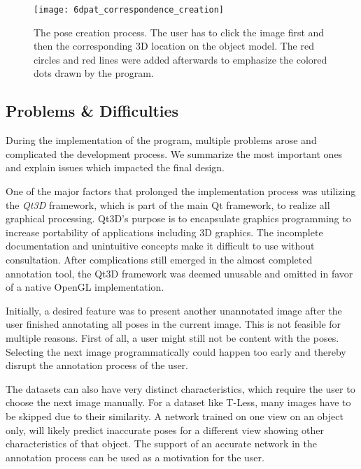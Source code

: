 \begin{figure}[!tbp]
	\centering
    \texttt{[image: 6dpat\_correspondence\_creation]}
    \caption{The pose creation process. The user has to click the image first and then the corresponding 3D location on the object model. The red circles and red lines were added afterwards to emphasize the colored dots drawn by the program.}
    \label{fig:6dpat_correspondence_creation}
\end{figure} 

\subsection{Problems \& Difficulties} \label{section:6dpat_difficulties}


During the implementation of the program, multiple problems arose and complicated the development process. We summarize the most important ones and explain issues which impacted the final design.

One of the major factors that prolonged the implementation process was utilizing the \textit{Qt3D} framework, which is part of the main Qt framework, to realize all graphical processing. Qt3D's purpose is to encapsulate graphics programming to increase portability of applications including 3D graphics. The incomplete documentation and unintuitive concepts make it difficult to use without consultation. After complications still emerged in the almost completed annotation tool, the Qt3D framework was deemed unusable and omitted in favor of a native OpenGL implementation.

Initially, a desired feature was to present another unannotated image after the user finished annotating all poses in the current image. This is not feasible for multiple reasons. First of all, a user might still not be content with the poses. Selecting the next image programmatically could happen too early and thereby disrupt the annotation process of the user.

The datasets can also have very distinct characteristics, which require the user to choose the next image manually. For a dataset like T-Less, many images have to be skipped due to their similarity. A network trained on one view on an object only, will likely predict inaccurate poses for a different view showing other characteristics of that object. The support of an accurate network in the annotation process can be used as a motivation for the user.

